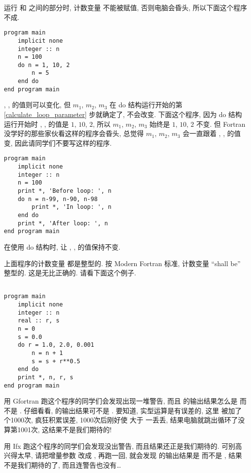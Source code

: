 运行  和  之间的部分时, 计数变量 \ttt{[m]} 不能被赋值, 否则电脑会昏头, 所以下面这个程序不成.
\begin{lstlisting}
program main
    implicit none
    integer :: n
    n = 100
    do n = 1, 10, 2
        n = 5
    end do
end program main
\end{lstlisting}
\ttt{[m1]}, \ttt{[m2]}, \ttt{[m3]} 的值则可以变化, 但 $m_1$, $m_2$, $m_3$ 在 do 结构运行开始的第 \ref{calculate_loop_parameter} 步就确定了, 不会改变. 下面这个程序, 因为 do 结构运行开始时 \ttt{[m1]}, \ttt{[m2]}, \ttt{[m3]} 的值是 $1$, $10$, $2$, 所以 $m_1$, $m_2$, $m_3$ 始终是 $1$, $10$, $2$ 不变. 但 Fortran 没学好的那些家伙看这样的程序会昏头, 总觉得 $m_1$, $m_2$, $m_3$ 会一直跟着 \ttt{[m1]}, \ttt{[m2]}, \ttt{[m3]} 的值变, 因此请同学们不要写这样的程序.
\begin{lstlisting}
program main
    implicit none
    integer :: n
    n = 100
    print *, 'Before loop: ', n
    do n = n-99, n-90, n-98
        print *, 'In loop: ', n
    end do
    print *, 'After loop: ', n
end program main
\end{lstlisting}
\begin{convention}
    在使用 do 结构时, 让 \ttt{\emph{[m1]}}, \ttt{\emph{[m2]}}, \ttt{\emph{[m3]}} 的值保持不变.
\end{convention}

上面程序的计数变量 \ttt{[m]} 都是整型的. 按 Modern Fortran 标准, 计数变量 ``shall be'' 整型的. 这是无比正确的. 请看下面这个例子.
\begin{lstlisting}

program main
    implicit none
    integer :: n
    real :: r, s
    n = 0
    s = 0.0
    do r = 1.0, 2.0, 0.001
        n = n + 1
        s = s + r**0.5
    end do
    print *, n, r, s
end program main
\end{lstlisting}

用 Gfortran 跑这个程序的同学们会发现出现一堆警告, 而且  的输出结果怎么是  而不是 . 仔细看看,  的输出结果可不是 . 要知道, 实型运算是有误差的, 这里  被加了个1000次, 疯狂积累误差, 1000次后刚好使  大于 一丢丢, 结果电脑就跳出循环了没算第1001次, 这结果不是我们期待的!

用 Ifx 跑这个程序的同学们会发现没出警告, 而且结果还正是我们期待的. 可别高兴得太早, 请把增量参数  改成 , 再跑一回, 就会发现  的输出结果是  而不是 , 结果不是我们期待的了, 而且连警告也没有\dots{}

